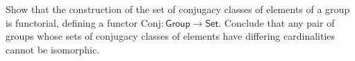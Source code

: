 \documentclass[main.tex]{subfiles}
\begin{document}

\begin{exercise}
	Show that the construction of the set of conjugacy classes of elements of a
	group is functorial, defining a functor
	\(\mathrm{Conj}\colon\mathsf{Group\to Set}\). Conclude that any pair of
	groups whose sets of conjugacy classes of elements have differing
	cardinalities cannot be isomorphic.
\end{exercise}
\end{document}

